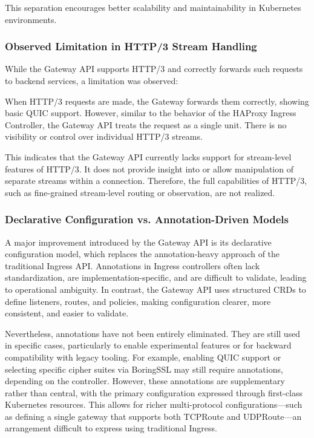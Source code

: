 This separation encourages better scalability and maintainability in Kubernetes environments.

\subsubsection{Observed Limitation in HTTP/3 Stream Handling}

While the Gateway API supports HTTP/3 and correctly forwards such requests to backend services, a limitation was observed:

When HTTP/3 requests are made, the Gateway forwards them correctly, showing basic QUIC support. However, similar to the behavior of the HAProxy Ingress Controller, the Gateway API treats the request as a single unit. There is no visibility or control over individual HTTP/3 streams.

This indicates that the Gateway API currently lacks support for stream-level features of HTTP/3. It does not provide insight into or allow manipulation of separate streams within a connection. Therefore, the full capabilities of HTTP/3, such as fine-grained stream-level routing or observation, are not realized.

\subsubsection{Declarative Configuration vs. Annotation-Driven Models}
A major improvement introduced by the Gateway API is its declarative configuration model, which replaces the annotation-heavy approach of the traditional Ingress API. Annotations in Ingress controllers often lack standardization, are implementation-specific, and are difficult to validate, leading to operational ambiguity. In contrast, the Gateway API uses structured CRDs to define listeners, routes, and policies, making configuration clearer, more consistent, and easier to validate.

Nevertheless, annotations have not been entirely eliminated. They are still used in specific cases, particularly to enable experimental features or for backward compatibility with legacy tooling. For example, enabling QUIC support or selecting specific cipher suites via BoringSSL may still require annotations, depending on the controller. However, these annotations are supplementary rather than central, with the primary configuration expressed through first-class Kubernetes resources. This allows for richer multi-protocol configurations—such as defining a single gateway that supports both TCPRoute and UDPRoute—an arrangement difficult to express using traditional Ingress.


